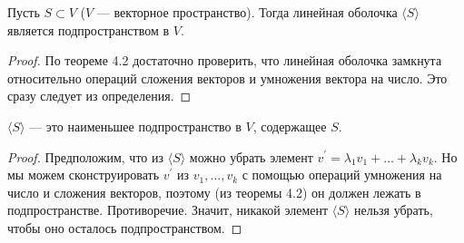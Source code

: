 \begin{theorem}
    Пусть $S \subset V$ ($V$ --- векторное пространство). Тогда линейная оболочка $\langle S\rangle$ является подпространством в $V$.
\end{theorem}

\begin{proof}
    По теореме 4.2 достаточно проверить, что линейная оболочка замкнута относительно операций сложения векторов и умножения вектора на число. Это сразу следует из определения.
\end{proof}

\begin{statement}
    $\langle S\rangle$ --- это наименьшее подпространство в $V$, содержащее $S$.
\end{statement}

\begin{proof}
    Предположим, что из $\langle S\rangle$ можно убрать элемент $v^\prime = \lambda_1v_1 + \ldots + \lambda_kv_k$. Но мы можем сконструировать $v^\prime$ из $v_1, \ldots, v_k$ с помощью операций умножения на число и сложения векторов, поэтому (из теоремы 4.2) он должен лежать в подпространстве. Противоречие. Значит, никакой элемент $\langle S\rangle$ нельзя убрать, чтобы оно осталось подпространством.
\end{proof}

